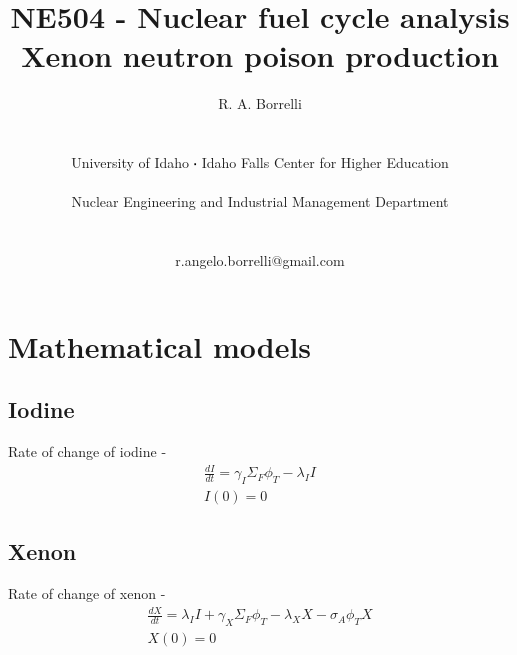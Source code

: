 \documentclass[11pt,a4paper]{article}
\newcommand*\sq{\mathbin{\vcenter{\hbox{\rule{.3ex}{.3ex}}}}} %
\begin{document}
\begin{titlepage}
    \title{
        NE504 - Nuclear fuel cycle analysis\\
        Xenon neutron poison production\\
    }
    \author{
        R. A. Borrelli
        \\ \\ \\
        University of Idaho $\sq$ Idaho Falls Center for Higher Education
        \\ \\
        Nuclear Engineering and Industrial Management Department
        \\ \\ \\
        r.angelo.borrelli@gmail.com
    }
\clearpage %
\maketitle
\thispagestyle{empty} %
\end{titlepage}

\section{Mathematical models}
\subsection{Iodine}
\noindent Rate of change of iodine - 
\begin{equation} \label{eq-i-dq}
    \begin{gathered}
        \frac{dI}{dt}=\gamma_I \Sigma_F \phi_T-\lambda_I I \\
        I(0)=0
    \end{gathered}
\end{equation}

\subsection{Xenon}
\noindent Rate of change of xenon - 
\begin{equation} \label{eq-xe-dq}
    \begin{gathered}
        \frac{dX}{dt}=\lambda_I I + \gamma_X \Sigma_F \phi_T - \lambda_X X - \sigma_A \phi_T X \\
        X(0)=0
    \end{gathered}
\end{equation}
\end{document}
